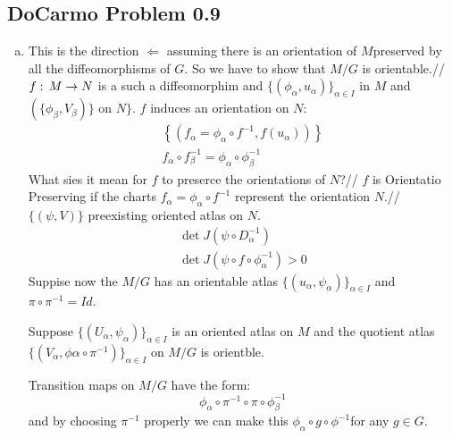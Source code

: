\subsection{DoCarmo Problem 0.9}
\begin{enumerate}[a)]
\item This is the direction $\Leftarrow$ assuming there is an orientation of $M$preserved by all the diffeomorphisms of $G$. So we have to show that $M/G$ is orientable.//
$f:\, M\to N$ is a such a diffeomorphim and $\{(\phi_\alpha, u_\alpha)\}_{\alpha\in I}$ in $M$ and $(\{\phi_\beta, V_\beta) \} \text{ on } N \}$. $f$ induces an orientation on $N$: 
\begin{gather*}
\left\{(f_\alpha = \phi_\alpha \circ f^{-1}, f(u_\alpha)) \right\}\\
f_\alpha\circ f_\beta^{-1} = \phi_\alpha\circ \phi_\beta^{-1}
\end{gather*}
What sies it mean for $f$ to preserce the orientations of $N$?//
$f$ is Orientatio Preserving if the charts $f_\alpha=\phi_\alpha \circ f^{-1}$ represent the orientation $N$.//
$\{(\psi,V)\}$ preexisting oriented atlas on $N$. 
\begin{gather*}
\det J(\psi \circ D_\alpha^{-1}) \\
\det J(\psi \circ f \circ \phi_\alpha^{-1}) > 0
\end{gather*}
Suppise now the $M/G$ has an orientable atlas $\{(u_\alpha,\psi_\alpha)\}_{\alpha\in I}$ and $\pi\circ \pi^{-1}=Id$.

Suppose $\{(U_\alpha,\psi_\alpha)\}_{\alpha\in I}$ is an oriented atlas on $M$ and the quotient atlas $\{(V_\alpha,\phi\alpha\circ \pi^{-1})\}_{\alpha\in I}$ on $M/G$ is orientble.

Transition maps on $M/G$ have the form:
$$\phi_\alpha\circ \pi^{-1} \circ \pi \circ \phi_\beta^{-1}$$
and by choosing $\pi^{-1}$ properly we can make this $\phi_\alpha\circ g\circ \phi^{-1} $for any $g\in G$.


\end{enumerate}
